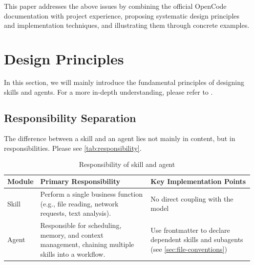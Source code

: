 \documentclass[]{article}
\newcommand{\myline}{\begin{center}\rule{0.5\linewidth}{0.5pt}\end{center}}
\begin{document}
This paper addresses the above issues by combining the official OpenCode
documentation with project experience, proposing
systematic design principles and implementation techniques, and
illustrating them through concrete examples.


\section{Design Principles}\label{sec:design-principles}

In this section, we will mainly introduce the fundamental principles of designing skills and agents. For a more in-depth understanding, please refer to \cite{xu2026agent}.

\subsection{Responsibility
Separation}\label{sec:responsibility-separation}

The difference between a skill and an agent lies not mainly in content, but in responsibilities. Please see \autoref{tab:responsibility}.

\begin{longtable}[]{@{}
  >{\raggedright\arraybackslash}p{}
  >{\raggedright\arraybackslash}p{}
  >{\raggedright\arraybackslash}p{}@{}}
\caption{Responsibility of skill and agent}
\label{tab:responsibility}
\\
\toprule
\begin{minipage}[b]{\linewidth}\raggedright
Module
\end{minipage} & \begin{minipage}[b]{\linewidth}\raggedright
Primary Responsibility
\end{minipage} & \begin{minipage}[b]{\linewidth}\raggedright
Key Implementation Points
\end{minipage} \\
\midrule
\endhead
\bottomrule
\endlastfoot
Skill & Perform a single business function (e.g., file reading, network
requests, text analysis). & No direct coupling with the model \\
Agent & Responsible for scheduling, memory, and context management,
chaining multiple skills into a workflow. & Use frontmatter to declare
dependent skills and subagents (see \autoref{sec:file-conventions}) \\
\end{longtable}
\end{document}
